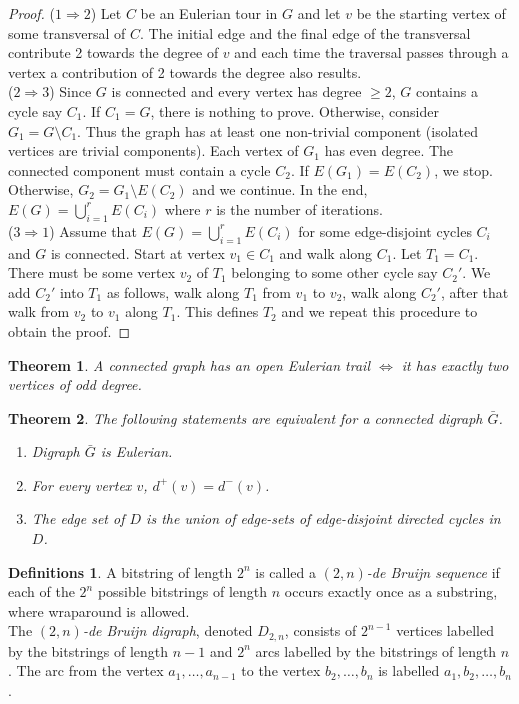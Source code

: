 \documentclass{article}
\newtheorem*{thm}{Theorem}
\theoremstyle{definition}
\newtheorem*{defns}{Definitions}
\begin{document}
\begin{proof}
($1\Rightarrow 2$) Let $C$ be an Eulerian tour in $G$ and let $v$ be the starting vertex of some transversal of $C$.
The initial edge and the final edge of the transversal contribute 2 towards the degree of $v$ and each time the traversal passes through a vertex a contribution of 2 towards the degree also results. \\
($2\Rightarrow 3$) Since $G$ is connected and every vertex has degree $\ge 2$, $G$ contains a cycle say $C_1$.
If $C_1 = G$, there is nothing to prove.
Otherwise, consider $G_1=G\setminus C_1$.
Thus the graph has at least one non-trivial component (isolated vertices are trivial components).
Each vertex of $G_1$ has even degree.
The connected component must contain a cycle $C_2$.
If $E(G_1) = E(C_2)$, we stop.
Otherwise, $G_2 = G_1\setminus E(C_2)$ and we continue.
In the end, $E(G) = \bigcup_{i=1}^r E(C_i)$ where $r$ is the number of iterations. \\
($3\Rightarrow 1$) Assume that $E(G) = \bigcup_{i=1}^r E(C_i)$ for some edge-disjoint cycles $C_i$ and $G$ is connected.
Start at vertex $v_1\in C_1$ and walk along $C_1$.
Let $T_1 = C_1$.
There must be some vertex $v_2$ of $T_1$ belonging to some other cycle say $C_2'$.
We add $C_2'$ into $T_1$ as follows, walk along $T_1$ from $v_1$ to $v_2$, walk along $C_2'$, after that walk from $v_2$ to $v_1$ along $T_1$.
This defines $T_2$ and we repeat this procedure to obtain the proof.
\end{proof}

\begin{thm}
A connected graph has an open Eulerian trail $\iff$ it has exactly two vertices of odd degree.
\end{thm}

\begin{thm}
The following statements are equivalent for a connected digraph $\bar{G}$.
\begin{enumerate}
\item Digraph $\bar{G}$ is Eulerian.
\item For every vertex $v$, $d^+(v) = d^-(v)$.
\item The edge set of $D$ is the union of edge-sets of edge-disjoint directed cycles in $D$.
\end{enumerate}
\end{thm}

\begin{defns}
A bitstring of length $2^n$ is called a \emph{$(2,n)$-de Bruijn sequence} if each of the $2^n$ possible bitstrings of length $n$ occurs exactly once as a substring, where wraparound is allowed. \\
The \emph{$(2,n)$-de Bruijn digraph}, denoted $D_{2,n}$, consists of $2^{n-1}$ vertices labelled by the bitstrings of length $n-1$ and $2^n$ arcs labelled by the bitstrings of length $n$.
The arc from the vertex $a_1,\ldots,a_{n-1}$ to the vertex $b_2,\ldots,b_n$ is labelled $a_1,b_2,\ldots,b_n$.
\end{defns}
\end{document}
